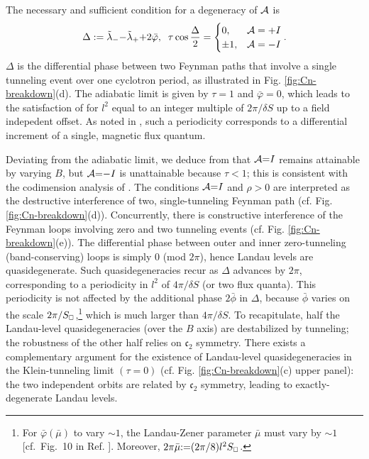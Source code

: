 \documentclass[aps, prb, showpacs, twocolumn, notitlepage, superscriptaddress]{revtex4-1}
\begin{document}



The necessary and sufficient condition for a degeneracy of ${\cal A}$ is 
\begin{align}
\Delta:= \tilde{\lambda}_-{-}\tilde{\lambda}_{+}{+}2\bar{\varphi},\;\;
\tau\cos\frac{\Delta}{2}= \begin{cases} 0, & {{\cal A}}=+I \\
                 \pm 1, & {\cal A} =-I\end{cases}.\label{c2breakdowndgncondition}
\end{align}
$\Delta$ is the differential phase between two Feynman paths  that involve a single tunneling event  over one cyclotron period, as illustrated in Fig. \ref{fig:Cn-breakdown}(d).
The adiabatic limit is given by $\tau{=}1$ and $\bar{\varphi}{=}0$, which leads to the satisfaction of  for $l^2$ equal to an integer multiple of $2\pi/\delta S$ up to a field indepedent offset. As noted in , such a periodicity corresponds to a differential increment of a single, magnetic flux quantum. 

Deviating from the adiabatic limit, we deduce from  that  ${\cal A}{=}I$ remains attainable by varying $B$, but ${\cal A}{=}{-}I$ is unattainable because $\tau{<}1$; this is consistent with the codimension analysis of . The conditions ${\cal A}{=}I$ and $\rho{>}0$ are interpreted as the destructive interference of  two, single-tunneling Feynman path (cf. Fig. \ref{fig:Cn-breakdown}(d)). Concurrently, there is constructive interference of the Feynman loops involving zero and two tunneling events (cf. Fig. \ref{fig:Cn-breakdown}(e)). The differential phase between outer and inner zero-tunneling (band-conserving) loops is simply 0 (mod $2\pi$), hence Landau levels are quasidegenerate. Such quasidegeneracies recur as $\Delta$ advances by $2\pi$, corresponding to a periodicity in $l^2$ of $4\pi/\delta S$ (or two flux quanta). This periodicity is not affected by the additional phase $2\bar{\phi}$ in $\Delta$, because $\bar{\phi}$ varies on the scale  $2\pi/S_{\scriptscriptstyle{\square}}$,\footnote{For $\bar{\varphi}(\bar{\mu})$ to vary  $\sim 1$, the Landau-Zener parameter $\bar{\mu}$ must vary by $\sim 1$ [cf.\  Fig.\ 10 in Ref. ]. Moreover, $2\pi\bar{\mu}{:}{=} (2\pi/8) l^2S_{\scriptscriptstyle{\square}}$.\cite{AALG}} which is much larger than $4\pi/\delta S$. To recapitulate, half the Landau-level quasidegeneracies (over the $B$ axis) are destabilized  by tunneling; the robustness of the other half relies on $\mathfrak{c}_2$ symmetry. There exists a complementary argument for the existence of Landau-level quasidegeneracies in the Klein-tunneling limit $(\tau{=}0)$ (cf. Fig. \ref{fig:Cn-breakdown}(c) upper panel): the two independent orbits are related by $\mathfrak{c}_2$ symmetry, leading to exactly-degenerate Landau levels.  
\end{document}
